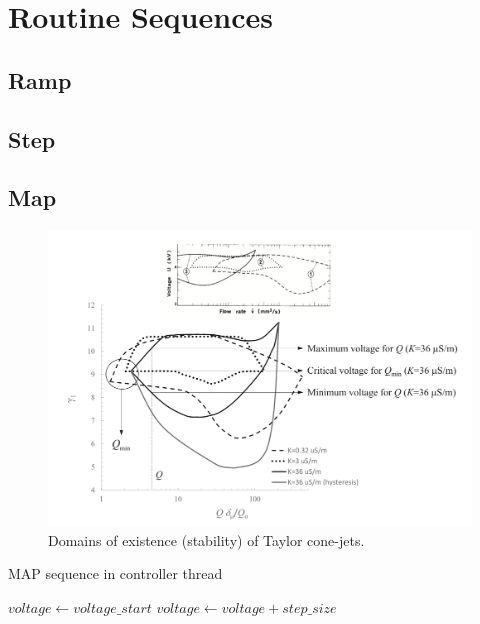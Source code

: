 \section{Routine Sequences}
\label{sec:routine_sequences}

\subsection{Ramp}

\subsection{Step}

\subsection{Map}

    \begin{figure}[H]
        \center
        \includegraphics[width=13cm]{Metodology/Figuras/ganan_calvo_map.png}
        \caption{Domains of existence (stability) of Taylor cone-jets. \cite{gananCalvo} }
        \label{fig:ganan_calvo_fig}
    \end{figure}


    \begin{algorithm}
        \caption{MAP sequence in controller thread}\label{alg:mapping_algorithm}
        \begin{algorithmic}
              
                \State {}
                \State $voltage \gets voltage\_start$
                 
                    \State {}
                    \State {}
                    \State $voltage \gets voltage + step\_size$
                \EndWhile
            \EndFor
        \EndProcedure

        \end{algorithmic}
    \end{algorithm}

